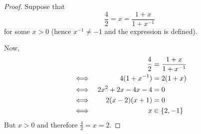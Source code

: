 \documentclass[fleqn,a4paper,11pt]{article}
\begin{document}
\begin{proof}
    Suppose that
    \begin{equation*}
    \frac 42 = x = \frac{1 + x}{1 + x^{-1}}
    \end{equation*}
    for some \(x > 0\) (hence \(x^{-1} \neq -1\) and the expression is defined).

    Now,
    \begin{alignat*}{2}
    &&\frac 42 &= \frac{1 + x}{1 + x^{-1}} \\
    &\iff& 4(1 + x^{-1}) &= 2(1 + x) \\
    &\iff& 2x^2 + 2x - 4x - 4 &= 0 \\
    &\iff& 2(x - 2)(x + 1) &= 0 \\
    &\iff& x &\in \set{2, -1} \\
    \end{alignat*}
    But \(x > 0\) and therefore \(\frac 42 = x = 2\).
\end{proof}
\end{document}
